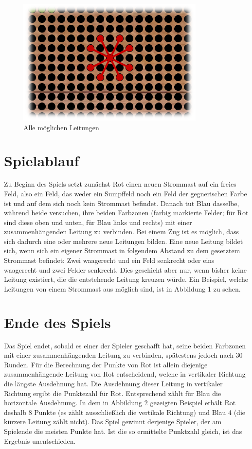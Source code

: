 \documentclass[a4paper, ngerman]{scrartcl}
\begin{document}
\begin{figure}[h!]
		\centering
		\includegraphics[scale = 0.8]{bilder/setzzug.png}
		\caption{Alle möglichen Leitungen}
		\label{fig:Leitungen}
\end{figure}
	
\section{Spielablauf}	 
Zu Beginn des Spiels setzt zunächst Rot einen neuen Strommast auf ein
freies Feld, also ein Feld, das weder ein Sumpffeld noch ein Feld der
gegnerischen Farbe ist und auf dem sich noch kein Strommast befindet. 
Danach tut Blau dasselbe, während beide versuchen,
ihre beiden Farbzonen (farbig markierte Felder; für Rot sind diese oben und
unten, für Blau  links und rechts) mit einer zusammenhängenden Leitung zu
verbinden.
Bei einem Zug ist es möglich, dass sich dadurch eine oder mehrere
neue Leitungen bilden. Eine neue Leitung bildet sich, wenn sich ein eigener
Strommast in folgendem Abstand zu dem gesetztem Strommast befindet: Zwei
waagerecht und ein Feld senkrecht oder eins waagerecht und zwei Felder
senkrecht. Dies geschieht aber nur, wenn bisher keine Leitung existiert, die
die entstehende Leitung kreuzen würde.
Ein Beispiel, welche Leitungen von einem Strommast aus möglich sind, ist
in Abbildung 1 zu sehen.
	 
	
\section{Ende des Spiels} 
Das Spiel endet, sobald es einer der Spieler geschafft hat, seine beiden
Farbzonen mit einer zusammenhängenden Leitung zu verbinden, spätestens jedoch
nach 30 Runden.
Für die Berechnung der Punkte von Rot ist allein diejenige zusammenhängende
Leitung von Rot entscheidend, welche in vertikaler Richtung die längste
Ausdehnung hat. Die Ausdehnung dieser Leitung in vertikaler Richtung ergibt
die Punktezahl für Rot. Entsprechend zählt für Blau die horizontale Ausdehnung.
In dem in Abbildung 2 gezeigten Beispiel erhält Rot deshalb 8 Punkte (es zählt ausschließlich
die vertikale Richtung)
und Blau 4 (die kürzere Leitung zählt nicht). Das Spiel gewinnt derjenige Spieler, der am Spielende
die meisten Punkte hat.
Ist die so ermittelte Punktzahl gleich, ist das Ergebnis unentschieden.
\end{document}
